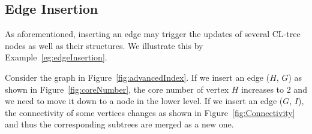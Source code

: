 \subsection{Edge Insertion}
\label{sec:edgeInsertion}

As aforementioned, inserting an edge may trigger the updates of several CL-tree nodes as well as their structures.
We illustrate this by Example~\ref{eg:edgeInsertion}.

\begin{example}
\label{eg:edgeInsertion}
Consider the graph in Figure~\ref{fig:advancedIndex}. If we insert an edge ($H$, $G$) as shown in Figure~\ref{fig:coreNumber}, the core number of vertex $H$ increases to 2 and we need to move it down to a node in the lower level. If we insert an edge ($G$, $I$), the connectivity of some vertices changes as shown in Figure~\ref{fig:Connectivity} and thus the corresponding subtrees are merged as a new one.
\end{example}

